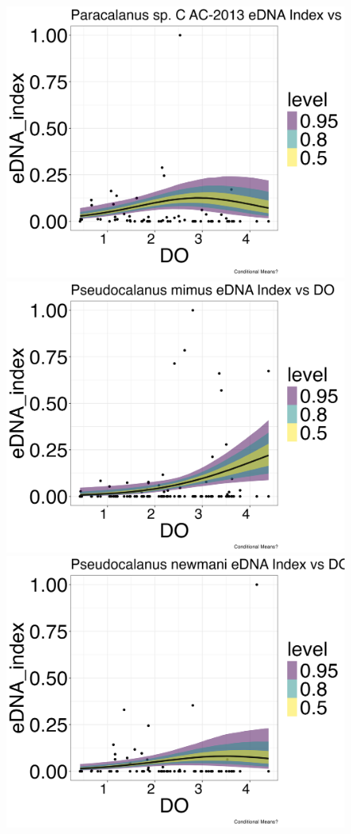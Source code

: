 \documentclass[12pt,twoside]{reedthesis}
\begin{document}
\begin{figure}[h]
\begin{center}
			\includegraphics[scale=0.25]{Paracalanus_ZOIB_Means_noOut}
			\includegraphics[scale=0.25]{Pmimus_ZOIB_Means_noOut}
			\includegraphics[scale=0.25]{Pnewmani_ZOIB_Means_noOut}

\end{center}
\end{figure}
\end{document}
